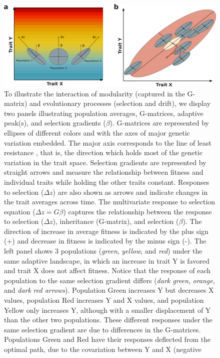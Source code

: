 \begin{refsection}
\begin{figure}
\includegraphics[width=\linewidth]{chapter_annual_review/media/figure2.png}
\caption[Selection, drift and covariation]{To illustrate the interaction of
modularity (captured in the G-matrix) and evolutionary processes
(selection and drift), we display two panels illustrating population
averages, G-matrices, adaptive peak(s), and selection gradients ($\beta$).
G-matrices are represented by ellipses of different colors and with the
axes of major genetic variation embedded. The major axis corresponds to
the line of least resistance \parencite{Schluter1996-gw}, 
that is, the direction which holds most of the genetic
variation in the trait space. Selection gradients are represented by
straight arrows and measure the relationship between fitness and
individual traits while holding the other traits constant. Responses to
selection ($\Delta z$) are also shown as arrows and indicate changes in the
trait averages across time. The multivariate response to selection
equation ($\Delta z = G\beta$) captures the relationship between the response to
selection ($\Delta z$), inheritance (G-matrix), and selection ($\beta$). The direction
of increase in average fitness is indicated by the plus sign (+) and
decrease in fitness is indicated by the minus sign (-). The left panel
shows 3 populations (\emph{green}, \emph{yellow}, and \emph{red}) under
the same adaptive landscape, in which an increase in trait Y is favored
and trait X does not affect fitness. Notice that the response of each
population to the same selection gradient differs (\emph{dark green},
\emph{orange,} and \emph{dark} \emph{red arrows}). Population Green
increases Y but decreases X values, population Red increases Y and X
values, and population Yellow only increases Y, although with a smaller
displacement of Y than the other two populations. These different
responses under the same selection gradient are due to differences in
the G-matrices. Populations Green and Red have their responses deflected
from the optimal path, due to the covariation between Y and X (negative
}
\end{figure}
\end{refsection}
